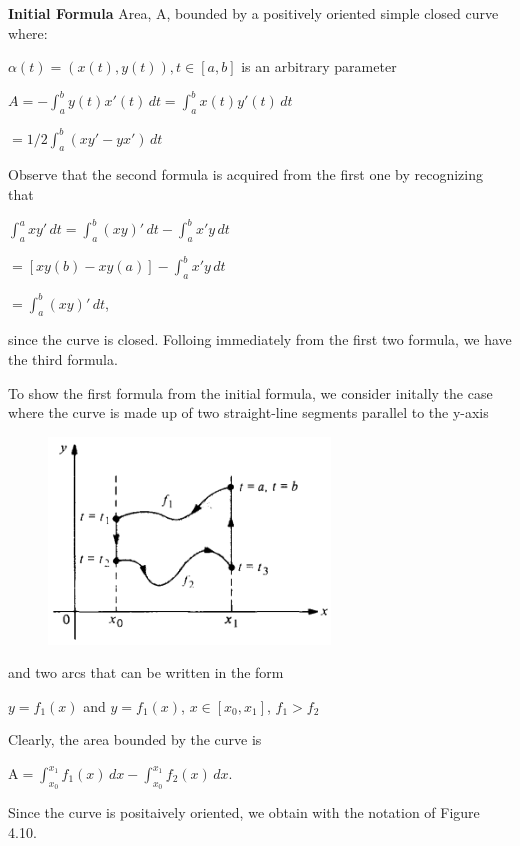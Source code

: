 \documentclass[a4paper]{book}
\numberwithin{theorem}{section}%
\begin{document}
\textbf{Initial Formula}
Area, A, bounded by a positively oriented simple closed curve where: 
\begin{center}
	$\displaystyle \alpha(t)=(x(t),y(t)), t\in [a,b]$ is an arbitrary parameter
\end{center}
\begin{center}
	$\displaystyle A=-\int_{a}^{b}y(t)x'(t)\,dt=\int_{a}^{b}x(t)y'(t)\,dt$

    $\displaystyle =1/2\int_{a}^{b}(xy'-yx')\,dt$
\end{center}
Observe that the second formula is acquired from the first one by recognizing that
\begin{center}
    $\displaystyle \int_{a}^{a}xy'\,dt=\int_{a}^{b}(xy)'\,dt-\int_{a}^{b}x'y\,dt$

    $\displaystyle =[xy(b)-xy(a)]-\int_{a}^{b}x'y\,dt$

    $\displaystyle = \int_{a}^{b}(xy)'\,dt$,
\end{center}
since the curve is closed. Folloing immediately from the first two formula, we have the third formula. 

To show the first formula from the initial formula, we consider initally the case where the curve is made up of two straight-line segments parallel to the y-axis
\begin{figure}[hbt!]
    \begin{center}   
        \includegraphics[width=75mm]{Schmidt1}
        \caption{}
    \end{center}
\end{figure}\leavevmode\newline
and two arcs that can be written in the form
\begin{center}
    $y=f_{1}(x)$ and $y=f_{1}(x)$, $x\in[x_{0},x_{1}]$, $f_{1}>f_{2}$
\end{center}
Clearly, the area bounded by the curve is
\begin{center}
    $\mathrm{A}=\int_{x_{0}}^{x_{1}}f_{1}(x)\,dx-\int_{x_{0}}^{x_{1}}f_{2}(x)\,dx$.
\end{center}
Since the curve is positaively oriented, we obtain with the notation of Figure 4.10.
\end{document}
